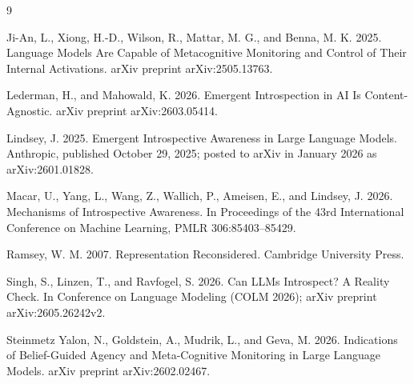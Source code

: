 \documentclass[11pt]{article}
\theoremstyle{definition}
\theoremstyle{remark}
\begin{document}
\begin{thebibliography}{9}

Ji-An, L., Xiong, H.-D., Wilson, R., Mattar, M. G., and Benna, M. K. 2025. Language Models Are Capable of Metacognitive Monitoring and Control of Their Internal Activations. arXiv preprint arXiv:2505.13763.

Lederman, H., and Mahowald, K. 2026. Emergent Introspection in AI Is Content-Agnostic. arXiv preprint arXiv:2603.05414.

Lindsey, J. 2025. Emergent Introspective Awareness in Large Language Models. Anthropic, published October 29, 2025; posted to arXiv in January 2026 as arXiv:2601.01828.

Macar, U., Yang, L., Wang, Z., Wallich, P., Ameisen, E., and Lindsey, J. 2026. Mechanisms of Introspective Awareness. In Proceedings of the 43rd International Conference on Machine Learning, PMLR 306:85403--85429.

Ramsey, W. M. 2007. Representation Reconsidered. Cambridge University Press.

Singh, S., Linzen, T., and Ravfogel, S. 2026. Can LLMs Introspect? A Reality Check. In Conference on Language Modeling (COLM 2026); arXiv preprint arXiv:2605.26242v2.


Steinmetz Yalon, N., Goldstein, A., Mudrik, L., and Geva, M. 2026. Indications of Belief-Guided Agency and Meta-Cognitive Monitoring in Large Language Models. arXiv preprint arXiv:2602.02467.

\end{thebibliography}
\end{document}
